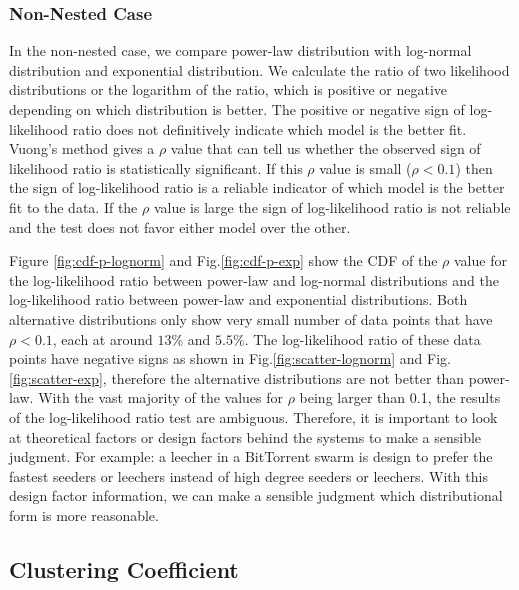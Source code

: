 \subsubsection{Non-Nested Case}
In the non-nested case, we compare power-law distribution with log-normal distribution and exponential distribution.
We calculate the ratio of two likelihood distributions or the logarithm of the ratio, which is positive or negative depending on which distribution is better.
The positive or negative sign of log-likelihood ratio does not definitively indicate which model is the better fit. 
Vuong's \cite{vuong1989likelihood}  method gives a $\rho$ value that can tell us whether the observed sign of likelihood ratio is statistically significant.
If this $\rho$ value is small ($\rho < 0.1$) then the sign of log-likelihood ratio is a reliable indicator of which model is the better fit to the data. 
If the $\rho$ value is large the sign of log-likelihood ratio is not reliable and the test does not favor either model over the other. 

Figure \ref{fig:cdf-p-lognorm} and Fig.\ref{fig:cdf-p-exp} show the CDF of the $\rho$ value for the log-likelihood ratio between power-law and log-normal distributions and the log-likelihood ratio between power-law and exponential distributions.
Both alternative distributions only show very small number of data points that have $\rho < 0.1$, each at around $13\%$ and $5.5\%$.
The log-likelihood ratio of these data points have negative signs as shown in Fig.\ref{fig:scatter-lognorm} and Fig.\ref{fig:scatter-exp}, therefore the alternative distributions are not better than power-law.
With the vast majority of the values for $\rho$ being larger than 0.1, the results of the log-likelihood ratio test are ambiguous. 
Therefore, it is important to look at theoretical factors or design factors behind the systems to make a sensible judgment.
For example: a leecher in a BitTorrent swarm is design to prefer the fastest seeders or leechers instead of high degree seeders or leechers. 
With this design factor information, we can make a sensible judgment which distributional form is more reasonable.


\subsection{Clustering Coefficient}\label{clusteringcoef}

